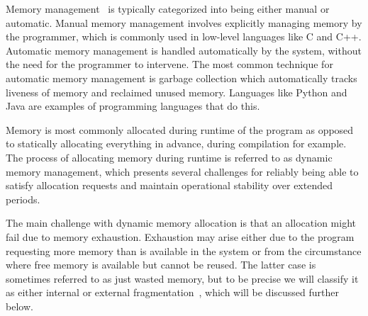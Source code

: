 
Memory management~\cite{gchandbook} is typically categorized into being either manual or automatic. Manual memory management involves explicitly managing memory by the programmer, which is commonly used in low-level languages like C and C++. Automatic memory management is handled automatically by the system, without the need for the programmer to intervene. The most common technique for automatic memory management is garbage collection which automatically tracks liveness of memory and reclaimed unused memory. Languages like Python and Java are examples of programming languages that do this.

Memory is most commonly allocated during runtime of the program as opposed to statically allocating everything in advance, during compilation for example. The process of allocating memory during runtime is referred to as dynamic memory management, which presents several challenges for reliably being able to satisfy allocation requests and maintain operational stability over extended periods.

The main challenge with dynamic memory allocation is that an allocation might fail due to memory exhaustion. Exhaustion may arise either due to the program requesting more memory than is available in the system or from the circumstance where free memory is available but cannot be reused. The latter case is sometimes referred to as just wasted memory, but to be precise we will classify it as either internal or external fragmentation~\cite{gchandbook}, which will be discussed further below.

